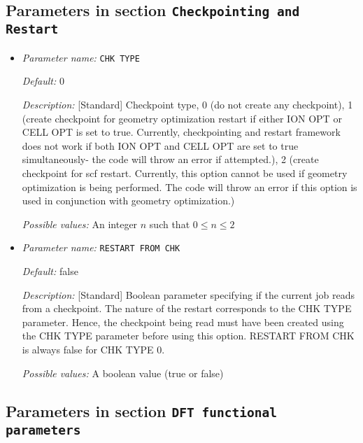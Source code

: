 \subsection{Parameters in section \tt Checkpointing and Restart}
\label{parameters:Checkpointing_20and_20Restart}

\begin{itemize}
\item {\it Parameter name:} {\tt CHK TYPE}
\label{parameters:Checkpointing and Restart/CHK TYPE}
\label{parameters:Checkpointing_20and_20Restart/CHK_20TYPE}




{\it Default:} 0


{\it Description:} [Standard] Checkpoint type, 0 (do not create any checkpoint), 1 (create checkpoint for geometry optimization restart if either ION OPT or CELL OPT is set to true. Currently, checkpointing and restart framework does not work if both ION OPT and CELL OPT are set to true simultaneously- the code will throw an error if attempted.), 2 (create checkpoint for scf restart. Currently, this option cannot be used if geometry optimization is being performed. The code will throw an error if this option is used in conjunction with geometry optimization.)


{\it Possible values:} An integer $n$ such that $0\leq n \leq 2$
\item {\it Parameter name:} {\tt RESTART FROM CHK}
\label{parameters:Checkpointing and Restart/RESTART FROM CHK}
\label{parameters:Checkpointing_20and_20Restart/RESTART_20FROM_20CHK}




{\it Default:} false


{\it Description:} [Standard] Boolean parameter specifying if the current job reads from a checkpoint. The nature of the restart corresponds to the CHK TYPE parameter. Hence, the checkpoint being read must have been created using the CHK TYPE parameter before using this option. RESTART FROM CHK is always false for CHK TYPE 0.


{\it Possible values:} A boolean value (true or false)
\end{itemize}

\subsection{Parameters in section \tt DFT functional parameters}
\label{parameters:DFT_20functional_20parameters}

